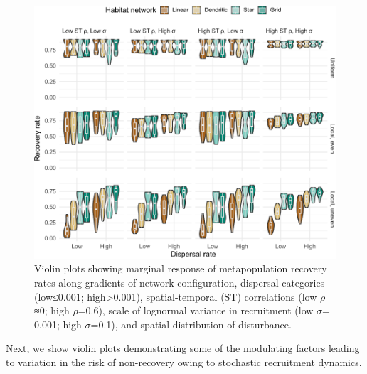 \documentclass[
]{article}
\begin{document}
\begin{figure}[H]

{\centering \includegraphics{Managing_for_ecological_surprises_in_metapopulations_files/figure-latex/violin plots of risk of recovery rates-1} 

}

\caption{Violin plots showing marginal response of metapopulation recovery rates along gradients of network configuration, dispersal categories (low≤0.001; high>0.001), spatial-temporal (ST) correlations (low $\rho$≈0; high $\rho$=0.6), scale of lognormal variance in recruitment (low $\sigma$= 0.001; high $\sigma$=0.1), and spatial distribution of disturbance.}\label{fig:violin plots of risk of recovery rates}
\end{figure}

Next, we show violin plots demonstrating some of the modulating factors
leading to variation in the risk of non-recovery owing to stochastic
recruitment dynamics.
\end{document}
